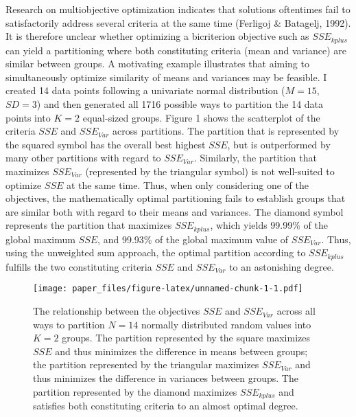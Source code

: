 \documentclass[
  man,floatsintext]{apa7}
\begin{document}
Research on multiobjective optimization indicates that solutions oftentimes fail to satisfactorily address several criteria at the same time (Ferligoj \& Batagelj, 1992). It is therefore unclear whether optimizing a bicriterion objective such as \(\mathit{SSE_{kplus}}\) can yield a partitioning where both constituting criteria (mean and variance) are similar between groups. A motivating example illustrates that aiming to simultaneously optimize similarity of means and variances may be feasible. I created 14 data points following a univariate normal distribution (\(M = 15\), \(SD = 3\)) and then generated all 1716 possible ways to partition the 14 data points into \(K = 2\) equal-sized groups. Figure 1 shows the scatterplot of the criteria \(\mathit{SSE}\) and \(\mathit{SSE_{Var}}\) across partitions. The partition that is represented by the squared symbol has the overall best highest \(\mathit{SSE}\), but is outperformed by many other partitions with regard to \(\mathit{SSE_{Var}}\). Similarly, the partition that maximizes \(\mathit{SSE_{Var}}\) (represented by the triangular symbol) is not well-suited to optimize \(\mathit{SSE}\) at the same time. Thus, when only considering one of the objectives, the mathematically optimal partitioning fails to establish groups that are similar both with regard to their means and variances. The diamond symbol represents the partition that maximizes \(\mathit{SSE_{kplus}}\), which yields 99.99\% of the global maximum \(\mathit{SSE}\), and 99.93\% of the global maximum value of \(\mathit{SSE_{Var}}\). Thus, using the unweighted sum approach, the optimal partition according to \(\mathit{SSE_{kplus}}\) fulfills the two constituting criteria \(\mathit{SSE}\) and \(\mathit{SSE_{Var}}\) to an astonishing degree.

\begin{figure}
\centering
\texttt{[image: paper\_files/figure-latex/unnamed-chunk-1-1.pdf]}
\caption{\label{fig:unnamed-chunk-1}The relationship between the objectives \(\mathit{SSE}\) and \(\mathit{SSE_{Var}}\) across all ways to partition \(N = 14\) normally distributed random values into \(K = 2\) groups. The partition represented by the square maximizes \(\mathit{SSE}\) and thus minimizes the difference in means between groups; the partition represented by the triangular maximizes \(\mathit{SSE_{Var}}\) and thus minimizes the difference in variances between groups. The partition represented by the diamond maximizes \(\mathit{SSE_{kplus}}\) and satisfies both constituting criteria to an almost optimal degree.}
\end{figure}
\end{document}
